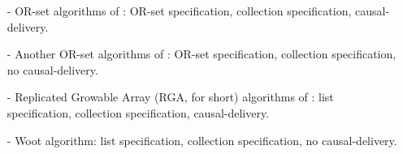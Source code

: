 \begin{itemize}
\setlength{\itemsep}{0.5pt}
\item[-] OR-set algorithms of \cite{Shapiro:2011}: OR-set specification, collection specification, causal-delivery. 

\item[-] Another OR-set algorithms of \cite{Bieniusa:2012}: OR-set specification, collection specification, no causal-delivery. 

\item[-] Replicated Growable Array (RGA, for short) algorithms of \cite{Attiya:2016}: list specification, collection specification, causal-delivery. 

\item[-] Woot algorithm: list specification, collection specification, no causal-delivery. 



\end{itemize}













